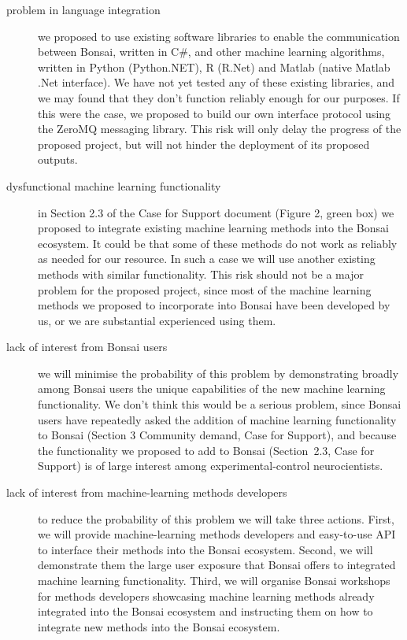 \documentclass[a4paper,11pt]{article}
\begin{document}
\begin{description}

    \item[problem in language integration] we proposed to use existing software
        libraries to enable the communication between Bonsai, written in C\#,
        and other machine learning algorithms, written in Python (Python.NET),
        R (R.Net) and Matlab (native Matlab .Net interface). We have not yet
        tested any of these existing libraries, and we may found that they
        don't function reliably enough for our purposes. If this were the case,
        we proposed to build our own interface protocol using the ZeroMQ
        messaging library.  This risk will only delay the progress of the
        proposed project, but will not hinder the deployment of its proposed
        outputs.

    \item[dysfunctional machine learning functionality] in Section 2.3 of the
        Case for Support document (Figure 2, green box) we proposed to
        integrate existing machine learning methods into the Bonsai ecosystem.
        It could be that some of these methods do not work as reliably as
        needed for our resource. In such a case we will use another existing
        methods with similar functionality.  This risk should not be a major
        problem for the proposed project, since most of the machine learning
        methods we proposed to incorporate into Bonsai have been
        developed by us, or we are substantial experienced using them.

    \item[lack of interest from Bonsai users] we will minimise the probability
        of this problem by demonstrating broadly among Bonsai users the unique
        capabilities of the new machine learning functionality.  We don't think
        this would be a serious problem, since Bonsai users have repeatedly
        asked the addition of machine learning functionality to Bonsai (Section
        3 Community demand, Case for Support), and because the functionality we
        proposed to add to Bonsai (Section~2.3, Case for Support) is of large
        interest among experimental-control neurocientists.

    \item[lack of interest from machine-learning methods developers] to reduce
        the probability of this problem we will take three actions. First, we
        will provide machine-learning methods developers and easy-to-use API to
        interface their methods into the Bonsai ecosystem. Second, we will
        demonstrate them the large user exposure that Bonsai offers to
        integrated machine learning functionality. Third, we will organise
        Bonsai workshops for methods developers showcasing machine learning
        methods already integrated into the Bonsai ecosystem and instructing
        them on how to integrate new methods into the Bonsai ecosystem.

    \end{description}
\end{document}
